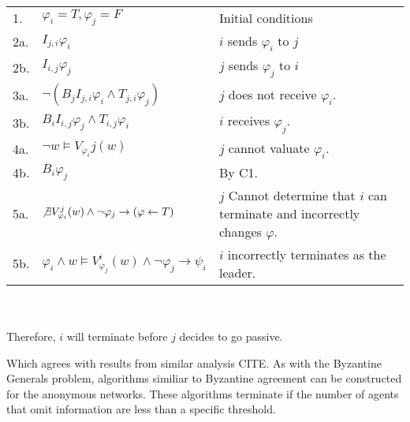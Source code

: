 \begin{table}[h!]
\centering
\small
\begin{tabularx}{\linewidth}{l X X}
1. & $\varphi_i = T, \varphi_j = F$ & Initial conditions \\
2a.& $I_{j,i} \varphi_i$ & $i$ sends $\varphi_i$ to $j$ \\
2b.& $I_{i,j} \varphi_j$ & $j$ sends $\varphi_j$ to $i$ \\
3a.& $\neg (B_j I_{j,i} \varphi_i \wedge T_{j,i} \varphi_j)$ & $j$ does not receive $\varphi_i$. \\
3b.& $B_i I_{i,j} \varphi_j \wedge T_{i,j} \varphi_i$ & $i$ receives $\varphi_j$. \\
4a.& $\neg w \vDash V_{\varphi_i}{j}(w)$ & $j$ cannot valuate $\varphi_i$. \\
4b.& $B_i \varphi_j$ & By C1. \\
5a. & $\not \exists V_{\varphi_i}^j(w) \wedge \neg \varphi_j \rightarrow (\varphi \gets T)$ & $j$ Cannot determine that $i$ can terminate and incorrectly changes $\varphi$. \\
5b. & $\varphi_i \wedge w \vDash V_{\varphi_j}^i(w) \wedge \neg \varphi_j \rightarrow \psi_i$ & $i$ incorrectly terminates as the leader. \\

\end{tabularx} \\~\\
Therefore, $i$ will terminate before $j$ decides to go passive.
\label{tab:anonymityproof}
\end{table}

Which agrees with results from similar analysis CITE.
As with the Byzantine Generals problem, algorithms similiar to Byzantine agreement can be constructed for the anonymous networks.
These algorithms terminate if the number of agents that omit information are less than a specific threshold. 
